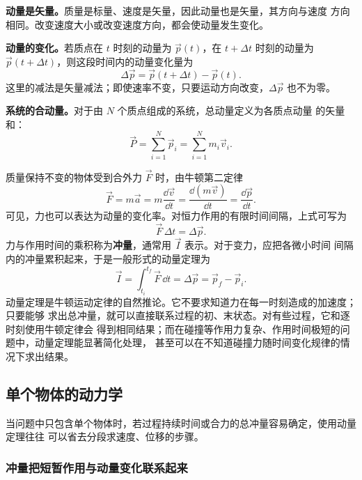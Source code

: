 {\textbf{动量是矢量。}\quad 质量是标量、速度是矢量，因此动量也是矢量，其方向与速度
方向相同。改变速度大小或改变速度方向，都会使动量发生变化。

\textbf{动量的变化。}\quad 若质点在 $t$ 时刻的动量为 $\vec p(t)$，在
$t+\Delta t$ 时刻的动量为 $\vec p(t+\Delta t)$，则这段时间内的动量变化量为
\begin{equation}
 \Delta\vec p=\vec p(t+\Delta t)-\vec p(t).
\end{equation}
这里的减法是矢量减法；即使速率不变，只要运动方向改变，$\Delta\vec p$ 也不为零。

\textbf{系统的合动量。}\quad 对于由 $N$ 个质点组成的系统，总动量定义为各质点动量
的矢量和：
\begin{equation}
 \vec P=\sum_{i=1}^{N}\vec p_i=\sum_{i=1}^{N}m_i\vec v_i.
\end{equation}

质量保持不变的物体受到合外力 $\vec F$ 时，由牛顿第二定律
\begin{equation}
 \vec F=m\vec a=m\frac{\dd\vec v}{\dd t}
 =\frac{\dd(m\vec v)}{\dd t}
 =\frac{\dd\vec p}{\dd t}.
\end{equation}
可见，力也可以表达为动量的变化率。对恒力作用的有限时间间隔，上式可写为
\begin{equation}
 \vec F\,\Delta t=\Delta\vec p.
\end{equation}
力与作用时间的乘积称为\textbf{冲量}，通常用 $\vec I$ 表示。对于变力，应把各微小时间
间隔内的冲量累积起来，于是一般形式的动量定理为
\begin{equation}
 \vec I=\int_{t_i}^{t_f}\vec F\,\dd t
 =\Delta\vec p=\vec p_f-\vec p_i.
\end{equation}
动量定理是牛顿运动定律的自然推论。它不要求知道力在每一时刻造成的加速度；只要能够
求出总冲量，就可以直接联系过程的初、末状态。对有些过程，它和逐时刻使用牛顿定律会
得到相同结果；而在碰撞等作用力复杂、作用时间极短的问题中，动量定理能显著简化处理，
甚至可以在不知道碰撞力随时间变化规律的情况下求出结果。

\subsection{单个物体的动力学}

当问题中只包含单个物体时，若过程持续时间或合力的总冲量容易确定，使用动量定理往往
可以省去分段求速度、位移的步骤。

\subsubsection*{冲量把短暂作用与动量变化联系起来}

}
